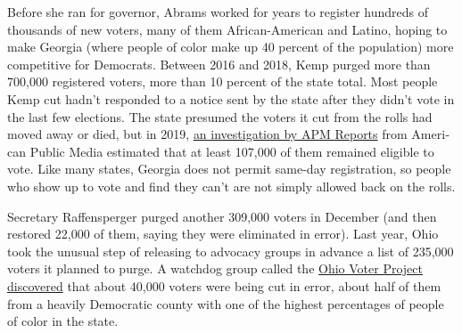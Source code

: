 Before she ran for governor, Abrams worked for years to register
hundreds of thousands of new voters, many of them African-American and
Latino, hoping to make Georgia (where people of color make up 40 percent
of the population) more competitive for Democrats. Between 2016 and
2018, Kemp purged more than 700,000 registered voters, more than 10
percent of the state total. Most people Kemp cut hadn't responded to a
notice sent by the state after they didn't vote in the last few
elections. The state presumed the voters it cut from the rolls had moved
away or died, but in 2019,
\href{https://www.apmreports.org/story/2019/10/29/georgia-voting-registration-records-removed}{an
investigation by APM Reports} from Ameri­can Public Media estimated that
at least 107,000 of them remained eligible to vote. Like many states,
Georgia does not permit same-day registration, so people who show up to
vote and find they can't are not simply allowed back on the rolls.

Secretary Raffensperger purged another 309,000 voters in December (and
then restored 22,000 of them, saying they were eliminated in error).
Last year, Ohio took the unusual step of releasing to advocacy groups in
advance a list of 235,000 voters it planned to purge. A watchdog group
called the
\href{https://www.nytimes3xbfgragh.onion/2019/10/14/us/politics/ohio-voter-purge.html}{Ohio
Voter Project discovered} that about 40,000 voters were being cut in
error, about half of them from a heavily Democratic county with one of
the highest percentages of people of color in the state.

